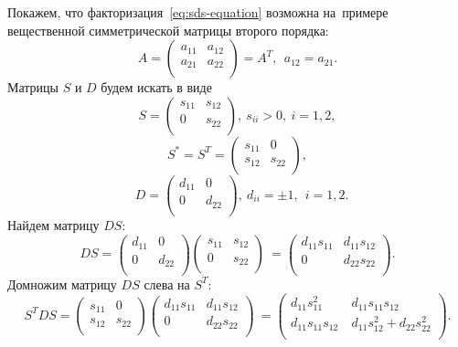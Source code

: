 \documentclass[11pt,a4paper,twoside,listtotoc,bibtotoc]{report}
\numberwithin{equation}{section}
\theoremstyle{definition}
\theoremstyle{plain}
\begin{document}
Покажем, что факторизация~\eqref{eq:sds-equation} возможна на~примере
вещественной симметрической матрицы второго порядка:
%
$$
    A =
    \begin{pmatrix}
        a_{11} & a_{12} \\
        a_{21} & a_{22} \\
    \end{pmatrix}
    = A^{T}, ~~a_{12} = a_{21}.
$$
%
Матрицы $S$ и $D$ будем искать в виде
$$
    S =
    \begin{pmatrix}
        s_{11} & s_{12} \\
        0      & s_{22} \\
    \end{pmatrix}
    ,~s_{ii} > 0,~i = 1,2,
$$
%
%
$$
    S^* = S^T =
    \begin{pmatrix}
        s_{11} & 0      \\
        s_{12} & s_{22} \\
    \end{pmatrix}
    ,
$$
%
%
$$
    ~~~D =
    \begin{pmatrix}
        d_{11} & 0      \\
        0      & d_{22} \\
    \end{pmatrix}
    , ~d_{ii} = \pm 1, ~~i = 1,2.
$$
%
Найдем матрицу $DS$:
%
$$
    DS =
    \begin{pmatrix}
        d_{11} & 0      \\
        0      & d_{22} \\
    \end{pmatrix}
    \begin{pmatrix}
        s_{11} & s_{12} \\
        0      & s_{22} \\
    \end{pmatrix}
    ~=
    \begin{pmatrix}
        d_{11}s_{11} & d_{11}s_{12} \\
        0            & d_{22}s_{22} \\
    \end{pmatrix}
    .
$$
%
Домножим матрицу $DS$ слева на $S^T$:
%
$$
    S^{T}DS =
    \begin{pmatrix}
        s_{11} & 0      \\
        s_{12} & s_{22} \\
    \end{pmatrix}
    \begin{pmatrix}
        d_{11}s_{11} & d_{11}s_{12} \\
        0            & d_{22}s_{22} \\
    \end{pmatrix}
    ~=
    \begin{pmatrix}
        d_{11}s_{11}^2   & ~d_{11}s_{11}s_{12}                  \\
        d_{11}s_{11}s_{12} & ~d_{11}s_{12}^2 + d_{22}s_{22}^2 \\
    \end{pmatrix}
    .
$$
\end{document}
